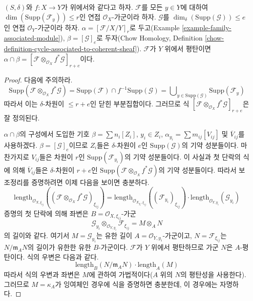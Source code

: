 \begin{lemma}
\label{lemma-action-coherent}
$(S, \delta)$와 $f : X \to Y$가 위에서와 같다고 하자.
$\mathcal{F}$를 모든 $y \in Y$에 대하여
$\dim(\text{Supp}(\mathcal{F}_y)) \leq r$인 연접
$\mathcal{O}_X$-가군이라 하자. $\mathcal{G}$를
$\dim_\delta(\text{Supp}(\mathcal{G})) \leq e$인 연접
$\mathcal{O}_Y$-가군이라 하자. $\alpha = [\mathcal{F}/X/Y]_r$로
두고(Example \ref{example-family-associated-module}),
$\beta = [\mathcal{G}]_e$로 두자(Chow Homology, Definition
\ref{chow-definition-cycle-associated-to-coherent-sheaf}).
$\mathcal{F}$가 $Y$ 위에서 평탄이면
$\alpha \cap \beta =
[\mathcal{F} \otimes_{\mathcal{O}_X} f^*\mathcal{G}]_{r + e}$이다.
\end{lemma}

\begin{proof}
다음에 주의하라.
$$
\text{Supp}(\mathcal{F} \otimes_{\mathcal{O}_X} f^*\mathcal{G}) =
\text{Supp}(\mathcal{F}) \cap f^{-1}\text{Supp}(\mathcal{G}) =
\bigcup\nolimits_{y \in \text{Supp}(\mathcal{G})} \text{Supp}(\mathcal{F}_y)
$$
따라서 이는 $\delta$-차원이 $\leq r + e$인 닫힌 부분집합이다.
그러므로 식
$[\mathcal{F} \otimes_{\mathcal{O}_X} f^*\mathcal{G}]_{r + e}$은
잘 정의된다.

\medskip\noindent
$\alpha \cap \beta$의 구성에서 도입한 기호
$\beta = \sum n_i[Z_i]$, $y_i \in Z_i$,
$\alpha_{y_i} = \sum m_{ij} [V_{ij}]$ 및
$\overline{V}_{ij}$를 사용하겠다. $\beta = [\mathcal{G}]_e$이므로
$Z_i$들은 $\delta$-차원이 $e$인 $\text{Supp}(\mathcal{G})$의 기약
성분들이다. 마찬가지로 $V_{ij}$들은 차원이 $r$인
$\text{Supp}(\mathcal{F}_{y_i})$의 기약 성분들이다. 이 사실과 첫
단락의 식에 의해 $\overline{V}_{ij}$들은 $\delta$-차원이
$r + e$인
$\text{Supp}(\mathcal{F} \otimes_{\mathcal{O}_X} f^*\mathcal{G})$의
기약 성분들이다. 따라서 보조정리를 증명하려면 이제 다음을 보이면
충분하다.
$$
\text{length}_{\mathcal{O}_{X, \xi_{ij}}}(
(\mathcal{F} \otimes_{\mathcal{O}_X} f^*\mathcal{G})_{\xi_{ij}})
=
\text{length}_{\mathcal{O}_{X_{y_i}, \xi_{ij}}}((\mathcal{F}_{y_i})_{\xi_{ij}})
\cdot
\text{length}_{\mathcal{O}_{Y, y_i}}(\mathcal{G}_{y_i})
$$
증명의 첫 단락에 의해 좌변은 $B = \mathcal{O}_{X, \xi_{ij}}$-가군
$$
\mathcal{G}_{y_i}
\otimes_{\mathcal{O}_{Y, y_i}}
\mathcal{F}_{\xi_{ij}} =
M \otimes_A N
$$
의 길이와 같다. 여기서 $M = \mathcal{G}_{y_i}$는 유한 길이
$A = \mathcal{O}_{Y, y_i}$-가군이고, $N = \mathcal{F}_{\xi_{ij}}$는
$N/\mathfrak m_AN$의 길이가 유한한 유한 $B$-가군이다.
$\mathcal{F}$가 $Y$ 위에서 평탄하므로 가군 $N$은 $A$-평탄이다.
식의 우변은 다음과 같다.
$$
\text{length}_B(N/\mathfrak m_A N) \cdot \text{length}_A(M)
$$
따라서 식의 우변과 좌변은 $M$에 관하여 가법적이다($A$ 위의 $N$의
평탄성을 사용한다). 그러므로 $M = \kappa_A$가 잉여체인 경우에 식을
증명하면 충분한데, 이 경우에는 자명하다.
\end{proof}

